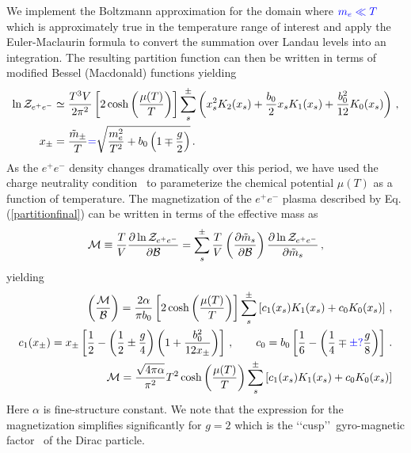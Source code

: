 \documentclass[a4paper]{article}
\newcommand{\req}[1]{Eq.\,(\ref{#1})}
\begin{document}
We implement the Boltzmann approximation for the domain where ${\color{blue}m_e\ll T}$ which is approximately true in the temperature range of interest and apply the Euler-Maclaurin formula to convert the summation over Landau levels into an integration. The resulting partition function can then be written in terms of modified Bessel (Macdonald) functions yielding
\begin{align}
    \label{partitionfinal}
    \ln{\cal Z}_{e^{+}e^{-}}&\simeq\frac{T^{3}V}{2\pi^{2}}\left[2\cosh\left(\frac{\mu(T)}{T}\right)\right]\sum_{s}^{\pm}\left(x_{s}^{2}K_{2}(x_{s})+\frac{b_{0}}{2}x_{s}K_{1}(x_{s})+\frac{b_{0}^{2}}{12}K_{0}(x_{s})\right)\,,\\
    x_{\pm}&=\frac{{\tilde m}_{\pm}}{T}{\color{blue}=}\sqrt{\frac{m_{e}^{2}}{T^{2}}+b_{0}\left(1\mp\frac{g}{2}\right)}\,.
\end{align}
As the $e^{+}e^{-}$ density changes dramatically over this period, we have used the charge neutrality condition~\cite{rafelski2023short} to parameterize the chemical potential $\mu(T)$ as a function of temperature. The magnetization of the $e^{+}e^{-}$ plasma described by \req{partitionfinal} can be written in terms of the effective mass as
\begin{align}
    \label{definemagetization}
    {\cal M}\equiv\frac{T}{V}\frac{\partial\ln{{\cal Z}_{e^{+}e^{-}}}}{\partial{\cal B}}=\sum_{s}^{\pm}\frac{T}{V}\left(\frac{\partial{\tilde m}_{s}}{\partial{\cal B}}\right)\frac{\partial\ln{{\cal Z}_{e^{+}e^{-}}}}{\partial{\tilde m}_{s}}\,,
\end{align}
yielding
\begin{align}
    \label{magnetization}
    \left(\frac{\cal M}{\cal B}\right)=\frac{2\alpha}{\pi b_{0}}\left[2\cosh\left(\frac{\mu(T)}{T}\right)\right]\sum_{s}^{\pm}\left[c_{1}(x_{s})K_{1}(x_{s})+c_{0}K_{0}(x_{s})\right]\,,\\
    c_{1}(x_{\pm})=x_{\pm}\left[\frac{1}{2}-\left(\frac{1}{2}\pm\frac{g}{4}\right)\left(1+\frac{b_{0}^{2}}{12x_{\pm}}\right)\right]\,,\qquad c_{0}=b_{0}\left[\frac{1}{6}-\left(\frac{1}{4}\mp{\color{blue}\pm?}\frac{g}{8}\right)\right]\,.\\
    {\cal M}=\frac{\sqrt{4\pi\alpha}}{ \pi^{2}}T^{2}\cosh\left(\frac{\mu(T)}{T}\right)\sum_{s}^{\pm}\left[c_{1}(x_{s})K_{1}(x_{s})+c_{0}K_{0}(x_{s})\right]
\end{align}
Here $\alpha$ is fine-structure constant. We note that the expression for the magnetization simplifies significantly for $g=2$ which is the \lq\lq cusp\rq\rq\ gyro-magnetic factor~\cite{rafelski2022study} of the Dirac particle.
\end{document}
